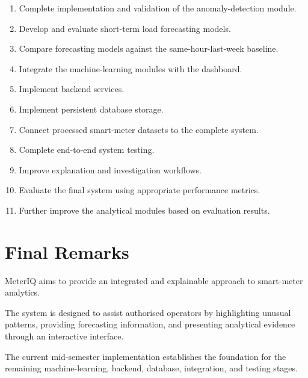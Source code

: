 \documentclass{tietreport}
\begin{document}
\begin{enumerate}

    \item Complete implementation and validation of the anomaly-detection
    module.

    \item Develop and evaluate short-term load forecasting models.

    \item Compare forecasting models against the same-hour-last-week
    baseline.

    \item Integrate the machine-learning modules with the dashboard.

    \item Implement backend services.

    \item Implement persistent database storage.

    \item Connect processed smart-meter datasets to the complete system.

    \item Complete end-to-end system testing.

    \item Improve explanation and investigation workflows.

    \item Evaluate the final system using appropriate performance metrics.

    \item Further improve the analytical modules based on evaluation results.

\end{enumerate}

\section{Final Remarks}

MeterIQ aims to provide an integrated and explainable approach to smart-meter
analytics.

The system is designed to assist authorised operators by highlighting
unusual patterns, providing forecasting information, and presenting
analytical evidence through an interactive interface.

The current mid-semester implementation establishes the foundation for the
remaining machine-learning, backend, database, integration, and testing
stages.


\clearpage

\printbibliography[title={References}]

\end{document}
